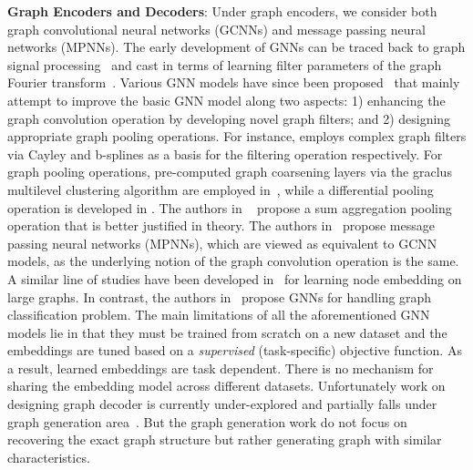 \documentclass{article}
\begin{document}
\textbf{Graph Encoders and Decoders}: Under graph encoders, we consider both graph convolutional neural networks (GCNNs) and  message passing neural networks (MPNNs).  The early development of GNNs can be traced back to graph signal processing~\cite{shuman2013emerging} and cast in terms of  learning filter parameters  of the graph Fourier transform~\cite{bruna2013spectral, henaff2015deep}. Various GNN models have since been proposed~\cite{kipf2016semi, atwood2016diffusion, li2018adaptive, duvenaud2015convolutional,puy2017unifying, dernbach2018quantum, zhang2019quantum}  that   mainly attempt to improve the basic GNN model along two aspects: 1) enhancing the graph convolution operation  by developing novel  graph filters; 
and 2) designing   appropriate graph pooling operations. For instance, \cite{levie2017cayleynets, fey2018splinecnn}  employs complex graph filters  via Cayley and b-splines as a basis for the  filtering operation respectively. For graph pooling operations, pre-computed graph coarsening layers via the graclus multilevel clustering algorithm are employed in~\cite{defferrard2016convolutional}, while a differential pooling operation    is developed in \cite{ying2018hierarchical}. 
The authors in ~\cite{xu2018powerful} propose a sum aggregation pooling operation that is better justified in theory. 
The authors in~\cite{lei2017deriving, gilmer2017neural,dai2016discriminative, garcia2017learning} propose message passing neural networks (MPNNs), which are viewed as equivalent to GCNN models, as the underlying notion of  the graph convolution operation is the same. A similar line of studies have been developed in~\cite{hamilton2017inductive,velivckovic2018deep}   for learning node embedding on large graphs. In contrast, the authors in~\cite{zhang2018end, verma2018graph} propose GNNs for handling graph classification problem. The main limitations of all the aforementioned GNN models lie in that they must be trained from scratch on a new dataset and the embeddings are tuned based on a {\em supervised} (task-specific) objective function. As a result, learned embeddings are task dependent. There is  no mechanism for sharing the embedding model across different datasets. 
Unfortunately  work on designing graph decoder is currently under-explored    and partially falls under graph generation area~\cite{simonovsky2018graphvae, you2018graphrnn, de2018molgan, you2018graph}. But the graph generation  work   do not focus on recovering the exact graph structure but rather generating graph with similar characteristics. 
\end{document}
